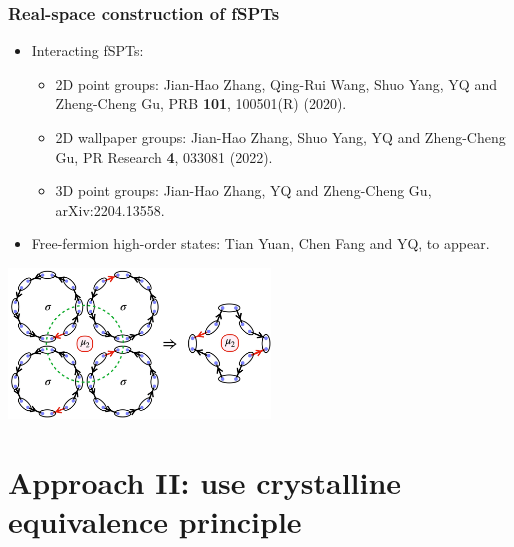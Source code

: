 \documentclass[xcolor=table, 11pt, aspectratio=169]{beamer}
\begin{document}
\begin{frame}
  \frametitle{Real-space construction of fSPTs}

  \begin{itemize}
  \item Interacting fSPTs:
    \begin{itemize}
    \item 2D point groups: Jian-Hao Zhang, Qing-Rui Wang, Shuo Yang, YQ and Zheng-Cheng Gu,
      PRB \textbf{101}, 100501(R) (2020).
    \item 2D wallpaper groups: Jian-Hao Zhang, Shuo Yang, YQ and Zheng-Cheng Gu,
      PR Research \textbf{4}, 033081 (2022).
    \item 3D point groups: Jian-Hao Zhang, YQ and Zheng-Cheng Gu, arXiv:2204.13558.
    \end{itemize}
  \item Free-fermion high-order states:
    Tian Yuan, Chen Fang and YQ, to appear.
  \end{itemize}
  \begin{center}
    \includegraphics[height=4cm]{majorana_bubble}    
  \end{center}
\end{frame}

\section{Approach II: use crystalline equivalence principle}
\end{document}
